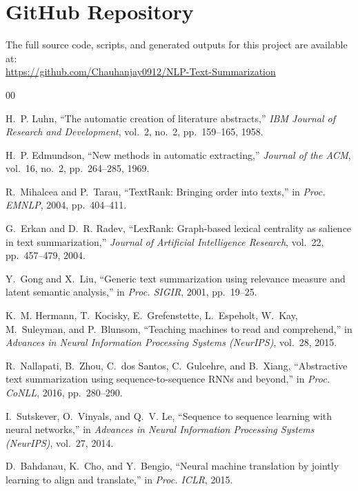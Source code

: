 \documentclass[conference]{IEEEtran}
\begin{document}
\section*{GitHub Repository}

The full source code, scripts, and generated outputs for this project are
available at:\\
\url{https://github.com/Chauhanjay0912/NLP-Text-Summarization}

\begin{thebibliography}{00}

H.~P. Luhn, ``The automatic creation of literature abstracts,''
\textit{IBM Journal of Research and Development}, vol.~2, no.~2,
pp.~159--165, 1958.

H.~P. Edmundson, ``New methods in automatic extracting,''
\textit{Journal of the ACM}, vol.~16, no.~2, pp.~264--285, 1969.

R.~Mihalcea and P.~Tarau, ``TextRank: Bringing order into texts,''
in \textit{Proc. EMNLP}, 2004, pp.~404--411.

G.~Erkan and D.~R. Radev, ``LexRank: Graph-based lexical centrality as
salience in text summarization,''
\textit{Journal of Artificial Intelligence Research}, vol.~22,
pp.~457--479, 2004.

Y.~Gong and X.~Liu, ``Generic text summarization using relevance measure
and latent semantic analysis,''
in \textit{Proc. SIGIR}, 2001, pp.~19--25.

K.~M. Hermann, T.~Kocisky, E.~Grefenstette, L.~Espeholt, W.~Kay,
M.~Suleyman, and P.~Blunsom, ``Teaching machines to read and comprehend,''
in \textit{Advances in Neural Information Processing Systems (NeurIPS)},
vol.~28, 2015.

R.~Nallapati, B.~Zhou, C.~dos Santos, C.~Gulcehre, and B.~Xiang,
``Abstractive text summarization using sequence-to-sequence RNNs and
beyond,''
in \textit{Proc. CoNLL}, 2016, pp.~280--290.

I.~Sutskever, O.~Vinyals, and Q.~V. Le, ``Sequence to sequence learning
with neural networks,''
in \textit{Advances in Neural Information Processing Systems (NeurIPS)},
vol.~27, 2014.

D.~Bahdanau, K.~Cho, and Y.~Bengio, ``Neural machine translation by
jointly learning to align and translate,''
in \textit{Proc. ICLR}, 2015.


\end{thebibliography}
\end{document}
